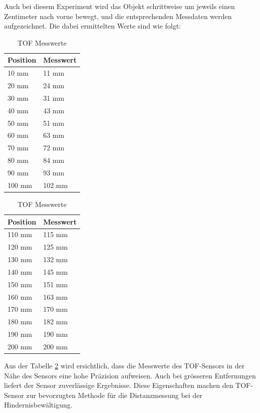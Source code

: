 \documentclass[../main.tex]{subfiles}
\begin{document}
Auch bei diesem Experiment wird das Objekt schrittweise um jeweils einen Zentimeter nach vorne bewegt, und die entsprechenden Messdaten werden aufgezeichnet. Die dabei ermittelten Werte sind wie folgt:
\begin{table}[H]
\centering
\begin{minipage}{0.45\textwidth}
\centering
\begin{tabular}{@{}ll@{}}
\toprule
\textbf{Position} & \textbf{Messwert} \\
\midrule
10 mm  & 11 mm  \\
20 mm  & 24 mm  \\
30 mm  & 31 mm  \\
40 mm  & 43 mm  \\
50 mm  & 51 mm  \\
60 mm  & 63 mm  \\
70 mm  & 72 mm  \\
80 mm  & 84 mm  \\
90 mm  & 93 mm  \\
100 mm & 102 mm \\
\bottomrule
\end{tabular}
\end{minipage}%
\hspace{0.05\textwidth} %
\begin{minipage}{0.45\textwidth}
\centering
\begin{tabular}{@{}ll@{}}
\toprule
\textbf{Position} & \textbf{Messwert} \\
\midrule
110 mm & 115 mm \\
120 mm & 125 mm \\
130 mm & 132 mm \\
140 mm & 145 mm \\
150 mm & 151 mm \\
160 mm & 163 mm \\
170 mm & 170 mm \\
180 mm & 182 mm \\
190 mm & 190 mm \\
200 mm & 200 mm \\
\bottomrule
\end{tabular}
\end{minipage}
\caption{TOF Messwerte}
\label{tab:TOFMD}
\end{table}

Aus der Tabelle \ref{tab:TOFMD} wird ersichtlich, dass die Messwerte des TOF-Sensors in der Nähe des Sensors eine hohe Präzision aufweisen. Auch bei grösseren Entfernungen liefert der Sensor zuverlässige Ergebnisse. Diese Eigenschaften machen den TOF-Sensor zur bevorzugten Methode für die Distanzmessung bei der Hindernisbewältigung.
\end{document}
